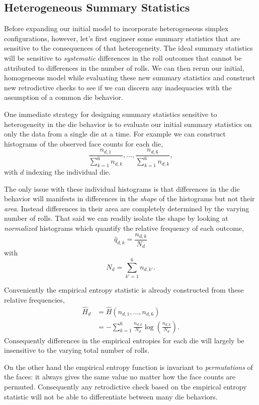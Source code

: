 \documentclass[
  letterpaper,
  DIV=11,
  numbers=noendperiod]{scrartcl}
\begin{document}
\subsection{Heterogeneous Summary
Statistics}\label{heterogeneous-summary-statistics}

Before expanding our initial model to incorporate heterogeneous simplex
configurations, however, let's first engineer some summary statistics
that are sensitive to the consequences of that heterogeneity. The ideal
summary statistics will be sensitive to \emph{systematic} differences in
the roll outcomes that cannot be attributed to differences in the number
of rolls. We can then rerun our initial, homogeneous model while
evaluating these new summary statistics and construct new retrodictive
checks to see if we can discern any inadequacies with the assumption of
a common die behavior.

One immediate strategy for designing summary statistics sensitive to
heterogeneity in the die behavior is to evaluate our initial summary
statistics on only the data from a single die at a time. For example we
can construct histograms of the observed face counts for each die, \[
\frac{ n_{d, 1} }{ \sum_{k = 1}^{6} n_{d, k} }, \ldots,
\frac{ n_{d, 6} }{ \sum_{k = 1}^{6} n_{d, k} },
\] with \(d\) indexing the individual die.

The only issue with these individual histograms is that differences in
the die behavior will manifests in differences in the \emph{shape} of
the histograms but not their \emph{area}. Instead differences in their
area are completely determined by the varying number of rolls. That said
we can readily isolate the shape by looking at \emph{normalized}
histograms which quantify the relative frequency of each outcome, \[
\hat{q}_{d, k} = \frac{ n_{d, k} }{ N_{d} }
\] with \[
N_{d} = \sum_{k' = 1}^{6} n_{d, k'}.
\]

Conveniently the empirical entropy statistic is already constructed from
these relative frequencies, \begin{align*}
\hat{H}_{d}
&=
\hat{H}(n_{d, 1}, \ldots, n_{d, 6})
\\
&=
- \sum_{k = 1}^{6}
\frac{n_{d, k}}{N_{d}} \log \left( \frac{n_{d, k}}{N_{d}} \right).
\end{align*} Consequently differences in the empirical entropies for
each die will largely be insensitive to the varying total number of
rolls.

On the other hand the empirical entropy function is invariant to
\emph{permutations} of the faces: it always gives the same value no
matter how the face counts are permuted. Consequently any retrodictive
check based on the empirical entropy statistic will not be able to
differentiate between many die behaviors.
\end{document}
